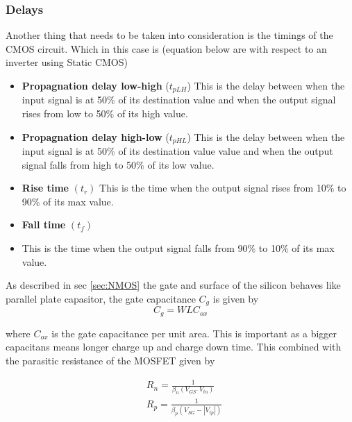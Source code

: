 \subsubsection{Delays}
Another thing that needs to be taken into consideration is the timings of the CMOS circuit. Which in this case is (equation below are with respect to an inverter using Static CMOS) \cite{departmentofelectronicsystemsntnu_2023_delay}
\begin{itemize}
    \item \textbf{Propagnation delay low-high} ($t_{pLH}$)
    \subitem This is the delay between when the input signal is at 50\% of its destination value and when the output signal rises from low to 50\% of its high value.
    \item \textbf{Propagnation delay high-low} ($t_{pHL}$)
    \subitem This is the delay between when the input signal is at 50\% of its destination value value and when the output signal falls from high to 50\% of its low value.\cite{wikipediacontributors_2023_signal}
    \item \textbf{Rise time} $\left(t_r\right)$
    \subitem This is the time when the output signal rises from 10\% to 90\% of its max value.
    \item \textbf{Fall time} $\left(t_f\right)$
    \item \subitem This is the time when the output signal falls from 90\% to 10\% of its max value.
\end{itemize}



As described in sec \ref{sec:NMOS} the gate and surface of the silicon behaves like parallel plate capasitor, the gate capacitance $C_g$ is given by \cite[p. 18]{carusone_2012_analog}
\begin{equation}
    C_g=WLC_{ox}
    \label{eq:gate_capacitance}
\end{equation}

where $C_{ox}$ is the gate capacitance per unit area. This is important as a bigger capacitans means longer charge up and charge down time. This combined with the parasitic resistance of the MOSFET given by \cite{departmentofelectronicsystemsntnu_2023_delay}

\begin{equation}
    \begin{aligned}
    & R_n=\frac{1}{\beta_n\left(V_{G S^{-}} V_{t n}\right)} \\
    & R_p=\frac{1}{\beta_p\left(V_{S G}-\left|V_{t p}\right|\right)}
    \end{aligned}
    \label{eq:parasitic_resistance}
\end{equation}


